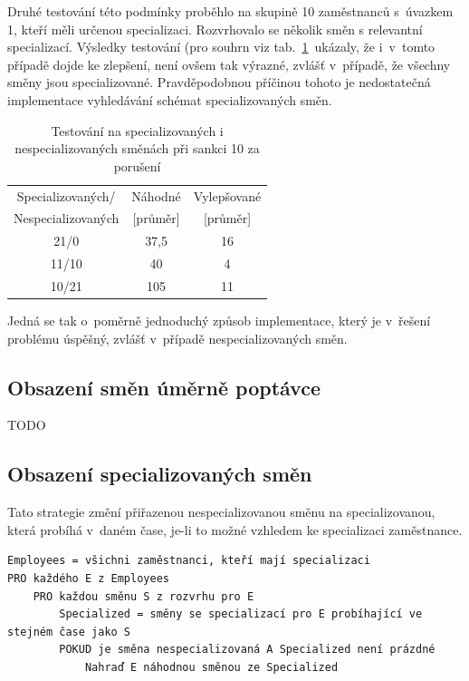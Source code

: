 \documentclass[twoside]{ctuthesis}
\begin{document}
Druhé testování této podmínky proběhlo na skupině 10 zaměstnanců s~úvazkem 1, kteří měli určenou specializaci. Rozvrhovalo se několik směn s relevantní specializací. Výsledky testování (pro souhrn viz tab.~\ref{tab:noemptyspecialized} ukázaly, že i~v~tomto případě dojde ke zlepšení, není ovšem tak výrazné, zvlášť v~případě, že všechny směny jsou specializované. Pravděpodobnou příčinou tohoto je nedostatečná implementace vyhledávání schémat specializovaných směn.

\begin{table}[h!]
	\caption{Testování na specializovaných i nespecializovaných směnách při sankci 10 za porušení}
	\label{tab:noemptyspecialized}
	\begin{tabular}{|c|c|c|}
		\hline
		Specializovaných/ & Náhodné & Vylepšované \\
		Nespecializovaných & [průměr] & [průměr] \\
		\hline
		21/0 & 37,5 & 16 \\
		11/10 & 40 & 4 \\
		10/21 & 105 & 11 \\
		\hline
	\end{tabular}

\end{table}

Jedná se tak o~poměrně jednoduchý způsob implementace, který je v~řešení problému úspěšný, zvlášť v~případě nespecializovaných směn.


\subsection{Obsazení směn úměrně poptávce}

TODO

\subsection{Obsazení specializovaných směn}
Tato strategie změní přiřazenou nespecializovanou směnu na specializovanou, která probíhá v~daném čase, je-li to možné vzhledem ke specializaci zaměstnance.

\begin{lstlisting}[caption={Pseudokód pro vylepšování obsazení specializovaných směn}]
Employees = všichni zaměstnanci, kteří mají specializaci
PRO každého E z Employees
	PRO každou směnu S z rozvrhu pro E
		Specialized = směny se specializací pro E probíhající ve stejném čase jako S
		POKUD je směna nespecializovaná A Specialized není prázdné
		 	Nahraď E náhodnou směnou ze Specialized
\end{lstlisting}
\end{document}
